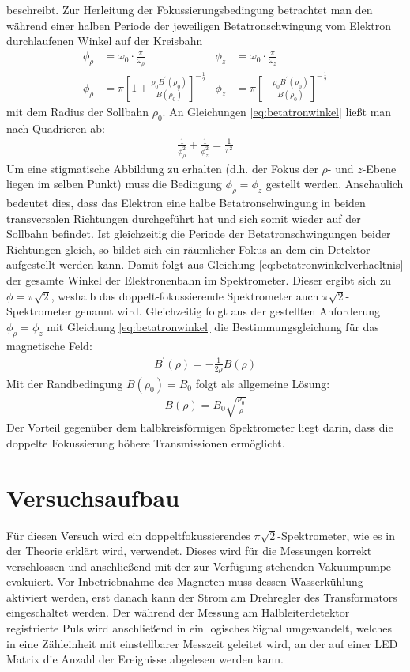 \documentclass[11pt, a4paper]{article}
\numberwithin{equation}{section}
\begin{document}
beschreibt.
Zur Herleitung der Fokussierungsbedingung betrachtet man den während einer halben Periode der jeweiligen Betatronschwingung vom Elektron durchlaufenen Winkel auf der Kreisbahn
\begin{align}
	\phi_\rho &= \omega_0 \cdot \frac{\pi}{\omega_\rho} & \phi_z &= \omega_0 \cdot \frac{\pi}{\omega_z}\\
	\phi_\rho &= \pi \left[ 1+ \frac{\rho_0 B^\prime(\rho_0)}{B(\rho_0)} \right]^{-\frac{1}{2}} & \phi_z &= \pi \left[ -\frac{\rho_0 B^\prime(\rho_0)}{B(\rho_0)} \right]^{-\frac{1}{2}} \label{eq:betatronwinkel}
\end{align}
mit dem Radius der Sollbahn $\rho_0$.
An Gleichungen \eqref{eq:betatronwinkel} ließt man nach Quadrieren ab:
\begin{align}
	\frac{1}{\phi_\rho^2} + \frac{1}{\phi_z^2} = \frac{1}{\pi^2} \label{eq:betatronwinkelverhaeltnis}
\end{align}
Um eine stigmatische Abbildung zu erhalten (d.h. der Fokus der $\rho$- und $z$-Ebene liegen im selben Punkt) muss die Bedingung $\phi_\rho = \phi_z$ gestellt werden.
Anschaulich bedeutet dies, dass das Elektron eine halbe Betatronschwingung in beiden transversalen Richtungen durchgeführt hat und sich somit wieder auf der Sollbahn befindet.
Ist gleichzeitig die Periode der Betatronschwingungen beider Richtungen gleich, so bildet sich ein räumlicher Fokus an dem ein Detektor aufgestellt werden kann.
Damit folgt aus Gleichung \eqref{eq:betatronwinkelverhaeltnis} der gesamte Winkel der Elektronenbahn im Spektrometer.
Dieser ergibt sich zu $\phi = \pi \sqrt{2}$, weshalb das doppelt-fokussierende Spektrometer auch $\pi \sqrt{2}$-Spektrometer genannt wird.
Gleichzeitig folgt aus der gestellten Anforderung $\phi_\rho = \phi_z$ mit Gleichung \eqref{eq:betatronwinkel} die Bestimmungsgleichung für das magnetische Feld\cite{siegbahn}:
\begin{align}
	B^\prime(\rho) = - \frac{1}{2 \rho} B(\rho)
\end{align}
Mit der Randbedingung $B(\rho_0) = B_0$ folgt als allgemeine Lösung:
\begin{align}
	B(\rho) = B_0 \sqrt{\frac{\rho_0}{\rho}}
\end{align}
Der Vorteil gegenüber dem halbkreisförmigen Spektrometer liegt darin, dass die doppelte Fokussierung höhere Transmissionen ermöglicht.

\section{Versuchsaufbau}
Für diesen Versuch wird ein doppeltfokussierendes $\pi\sqrt{2}$-Spektrometer, wie es in der Theorie erklärt wird, verwendet.
Dieses wird für die Messungen korrekt verschlossen und anschließend mit der zur Verfügung stehenden Vakuumpumpe evakuiert.
Vor Inbetriebnahme des Magneten muss dessen Wasserkühlung aktiviert werden, erst danach kann der Strom am Drehregler des Transformators eingeschaltet werden.
Der während der Messung am Halbleiterdetektor registrierte Puls wird anschließend in ein logisches Signal umgewandelt, welches in eine Zähleinheit mit einstellbarer Messzeit geleitet wird, an der auf einer LED Matrix die Anzahl der Ereignisse abgelesen werden kann.
\end{document}

